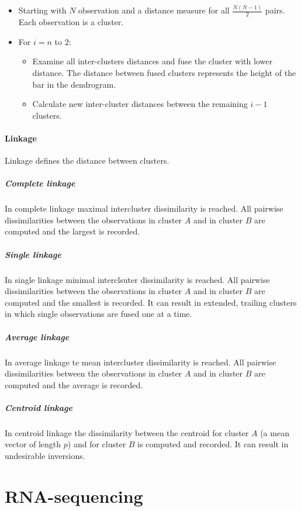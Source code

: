 			\begin{multicols}{2}
				\begin{itemize}
					\item Starting with $N$ observation and a distance measure for all $\frac{N(N-1)}{2}$ pairs.
						Each observation is a cluster.
					\item For $i =n$ to $2$:

						\begin{itemize}
							\item Examine all inter-clusters distances and fuse the cluster with lower distance.
								The distance between fused clusters represents the height of the bar in the dendrogram.
							\item Calculate new inter-cluster distances between the remaining $i-1$ clusters.
						\end{itemize}

				\end{itemize}
			\end{multicols}

			\paragraph{Linkage}
			Linkage defines the distance between clusters.

				\subparagraph{Complete linkage}
				In complete linkage maximal intercluster dissimilarity is reached.
				All pairwise dissimilarities between the observations in cluster $A$ and in cluster $B$ are computed and the largest is recorded.

				\subparagraph{Single linkage}
				In single linkage minimal interclsuter dissimilarity is reached.
				All pairwise dissimilarities between the observations in cluster $A$ and in cluster $B$ are computed and the smallest is recorded.
				It can result in extended, trailing clusters in which single observations are fused one at a time.

				\subparagraph{Average linkage}
				In average linkage te mean intercluster dissimilarity  is reached.
				All pairwise dissimilarities between the observations in cluster $A$ and in cluster $B$ are computed and the average is recorded.

				\subparagraph{Centroid linkage}
				In centroid linkage the dissimilarity between the centroid for cluster $A$ (a mean vector of length $p$) and for cluster $B$ is computed and recorded.
				It can result in undesirable inversions.

\section{RNA-sequencing}

